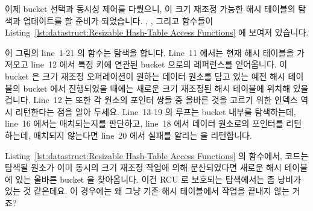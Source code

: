 이제 bucket 선택과 동시성 제어를 다뤘으니, 이 크기 재조정 가능한 해시 테이블의
탐색과 업데이트를 할 준비가 되었습니다.
, , 그리고  함수들이
Listing~\ref{lst:datastruct:Resizable Hash-Table Access Functions} 에 보여져
있습니다.

이 그림의 line~1-21 의  함수는 탐색을 합니다.
Line~11 에서는 현재 해시 테이블을 가져오고 line~12 에서 특정 키에 연관된 bucket
으로의 레퍼런스를 얻어옵니다.
이 bucket 은 크기 재조정 오퍼레이션이 원하는 데이터 원소를 담고 있는 예전 해시
테이블의 bucket 에서 진행되었을 때에는 새로운 크기 재조정된 해시 테이블에
위치해 있을 겁니다.
Line~12 는 또한 각 원소의 포인터 쌍들 중 올바른 것을 고르기 위한 인덱스 역시
리턴한다는 점을 알아 두세요.
Line~13-19 의 루프는 bucket 내부를 탐색하는데, line~16 에서는 매치되는지를
판단하고, line~18 에서 데이터 원소로의 포인터를 리턴하는데, 매치되지 않는다면
line~20 에서 실패를 알리는  을 리턴합니다.

\QuickQuiz{}
	Listing~\ref{lst:datastruct:Resizable Hash-Table Access Functions} 의
	 함수에서, 코드는 탐색될 원소가 이미 동시의 크기
	재조정 작업에 의해 분산되었다면 새로운 해시 테이블에 있는 올바른 bucket
	을 찾아옵니다.
	이건 RCU 로 보호되는 탐색에서는 좀 낭비가 있는 것 같은데요.
	이 경우에는 왜 그냥 기존 해시 테이블에서 작업을 끝내지 않는 거죠?
	\iffalse

